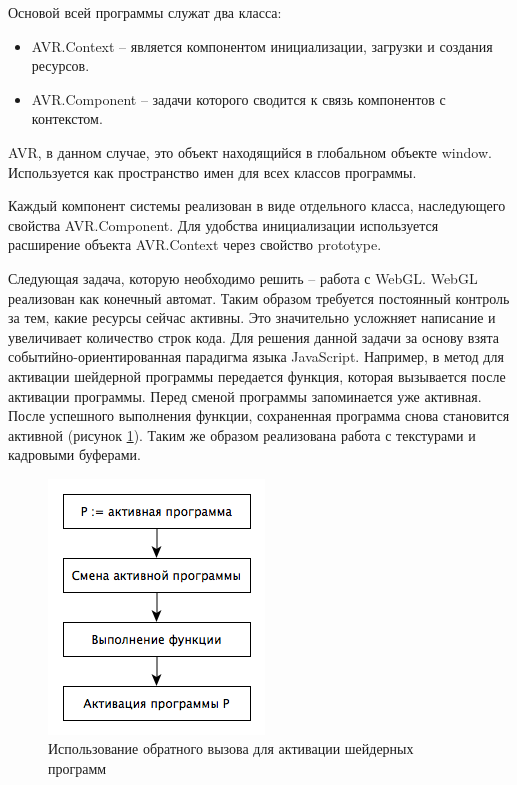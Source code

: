 Основой всей программы служат два класса: 

\begin{itemize}
  \item AVR.Context -- является компонентом инициализации, загрузки и создания ресурсов.
  \item AVR.Component -- задачи которого сводится к связь компонентов с контекстом.
\end{itemize}

AVR, в данном случае, это объект находящийся в глобальном объекте window. Используется 
как пространство имен для всех классов программы. 

Каждый компонент системы реализован в виде отдельного класса, наследующего свойства 
AVR.Component. Для удобства инициализации используется расширение объекта AVR.Context
через свойство prototype.


Следующая задача, которую необходимо решить -- работа с WebGL. WebGL реализован как конечный
автомат. Таким образом требуется постоянный контроль за тем, какие ресурсы сейчас активны. Это
значительно усложняет написание и увеличивает количество строк кода. Для решения данной задачи
за основу взята событийно-ориентированная парадигма языка JavaScript. 
Например, в метод для активации шейдерной программы передается функция, которая
вызывается после активации программы. Перед сменой программы запоминается уже активная. 
После успешного выполнения функции, сохраненная программа снова становится активной (рисунок \ref{fig:callback}).
Таким же образом реализована работа с текстурами и кадровыми буферами.

\begin{figure}
\begin{center}
  \includegraphics[scale=1]{Figures/callback}
\end{center}
\caption{Использование обратного вызова для активации шейдерных программ}
\label{fig:callback}
\end{figure}


